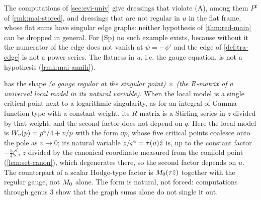 \begin{rmk}
\label{rmk:mai-necessity}
The computations of \cref{sec:evi-univ} give dressings that violate (A), among them $P^\sharp$ of \cref{rmk:mai-stored}, and dressings that are not regular in $u$ in the flat frame, whose flat sums have singular edge graphs: neither hypothesis of \cref{thm:red-main} can be dropped in general. For (Sp) no such example exists, because without it the numerator of the edge does not vanish at $\psi=-\psi'$ and the edge of \cref{def:tra-edge} is not a power series. The flatness in $u$, i.e. the gauge equation, is not a hypothesis (\cref{rmk:mai-annih}).
\end{rmk}

\begin{rmk}
\label{rmk:mai-analogy}
 has the shape \emph{(a gauge regular at the singular point) $\times$ (the $R$-matrix of a universal local model in its natural variable)}. When the local model is a single critical point next to a logarithmic singularity, as for an integral of Gamma-function type with a constant weight, its $R$-matrix is a Stirling series in $z$ divided by that weight, and the second factor does not depend on $q$. Here the local model is $W_{v}(p)=p^4/4+v/p$ with the form $\dd p$, whose five critical points coalesce onto the pole as $v\to0$; its natural variable $z/\varsigma^4=\tau(u)\hat{z}$ is, up to the constant factor $-\frac54\zeta^i$, $z$ divided by the canonical coordinate measured from the conifold point (\cref{lem:set-canon}), which degenerates there, so the second factor depends on $u$. The counterpart of a scalar Hodge-type factor is $M_{0}(\tau\hat{z})$ together with the regular gauge, not $M_{0}$ alone. The form is natural, not forced: computations through genus $3$ show that the graph sums alone do not single it out.
\end{rmk}

